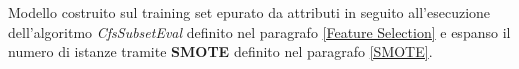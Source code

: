 Modello costruito sul training set epurato da attributi in seguito all'esecuzione dell'algoritmo \textit{CfsSubsetEval} definito nel paragrafo \ref{Feature Selection} e espanso il numero di istanze tramite \textbf{SMOTE} definito nel paragrafo \ref{SMOTE}.

%
%
%
%
%
%
%
